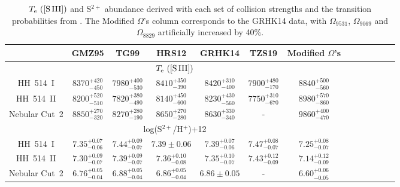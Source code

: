 \documentclass[fleqn,usenatbib]{mnras}
\begin{document}
\begin{table}
\centering
\caption{$T_{\rm e} \text{ ([S\thinspace III])}$ and S$^{2+}$ abundance derived with each set of collision strengths and the transition probabilities from \citet{FFTI06}. The Modified $\Omega$'s column corresponds to the GRHK14 data, with $\Omega_{9531}$, $\Omega_{9069}$ and $\Omega_{8829}$ artificially increased by 40\%.}
\label{tab:modified_data_omega}
\begin{adjustbox}{width=\textwidth}
\begin{tabular}{ccccccccccccc}
\hline
 &  GMZ95 & TG99 & HRS12 & GRHK14 & TZS19 & Modified $\Omega$'s\\
\hline

\multicolumn{7}{c}{$T_{\rm e} \text{ ([S\thinspace III])}$} \\

HH~514~I  & $8370^{+420} _{-450}$ & $7980^{+400} _{-530}$ & $8410^{+350} _{-390}$ & $8420^{+310} _{-400}$ & $7900^{+480} _{-170}$ & $8840^{+500} _{-560}$ \\

HH~514~II & $8200^{+520} _{-510}$ & $7820^{+380} _{-490}$ & $8140^{+450} _{-600}$& $8230^{+430} _{-560}$ &$7750^{+310} _{-670}$ & $8980^{+570} _{-860}$\\

Nebular Cut~2 & $8850^{+270} _{-320}$ & $8270^{+280} _{-190}$ & $8650^{+270} _{-280}$ & $8630^{+330} _{-340}$ & - & $9860^{+400} _{-470}$\\

\multicolumn{7}{c}{log(S$^{2+}$/H$^{+}$)+12} \\

HH~514~I & $7.35^{+0.07} _{-0.06}$ & $7.44^{+0.09} _{-0.07}$&$7.39 \pm 0.06 $&$7.39^{+0.07} _{-0.06}$&$7.47^{+0.08} _{-0.07}$&$7.25^{+0.08} _{-0.07}$\\

HH~514~II & $7.30^{+0.09} _{-0.07}$ & $7.39^{+0.09} _{-0.07}$& $7.36^{+0.10} _{-0.08}$&$7.35^{+0.10} _{-0.07}$& $7.43^{+0.12} _{-0.09}$ & $7.14^{+0.12} _{-0.09}$\\

Nebular Cut~2 &$6.76^{+0.05} _{-0.04}$ &$6.88^{+0.05} _{-0.04}$ &$6.86^{+0.05} _{-0.04}$ &$6.86 \pm 0.05 $ &-&$6.60^{+0.06} _{-0.05}$ \\

\hline
\end{tabular}
\end{adjustbox}
\end{table}
\end{document}
